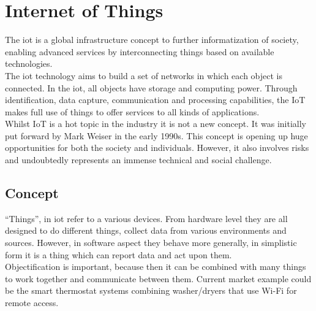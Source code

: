 \section{Internet of Things} 
The \gls{iot} is a global infrastructure concept to further informatization of society, enabling advanced services by interconnecting things based on available technologies.\\The \gls{iot} technology aims to build a set of networks in which each object is connected. In the \gls{iot}, all objects have storage and computing power\cite{7263548}. Through identification, data capture, communication and processing capabilities, the IoT makes full use of things to offer services to all kinds of applications. \\Whilst IoT is a hot topic in the industry it is not a new concept. It was initially put forward by Mark Weiser in the early 1990s. This concept is opening up huge opportunities for both the society and individuals. However, it also involves risks and undoubtedly represents an immense technical and social challenge.\cite{iot}
\subsection{Concept} %
\label{sub:concept}
``Things'', in \gls{iot} refer to a various devices. From hardware level they are all designed to do different things, collect data from various environments and sources. However, in software aspect they behave more generally, in simplistic form it is a thing which can report data and act upon them. \\Objectification is important, because then it can be combined with many things to work together and communicate between them. Current market example could be the smart thermostat systems combining washer/dryers that use Wi-Fi for remote access.
